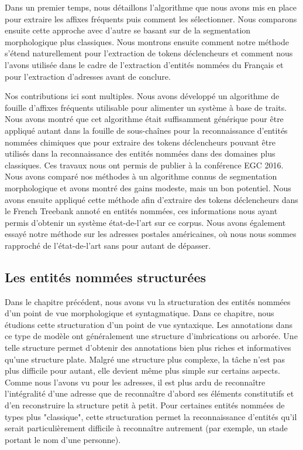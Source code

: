 \documentclass[PhD-Yoann-Dupont.tex]{subfiles}
\begin{document}
Dans un premier temps, nous détaillons l'algorithme que nous avons mis en place pour extraire les affixes fréquents puis comment les sélectionner. Nous comparons ensuite cette approche avec d'autre se basant sur de la segmentation morphologique plus classiques. Nous montrons ensuite comment notre méthode s'étend naturellement pour l'extraction de tokens déclencheurs et comment nous l'avons utilisée dans le cadre de l'extraction d'entités nommées du Français et pour l'extraction d'adresses avant de conclure.

Nos contributions ici sont multiples. Nous avons développé un algorithme de fouille d'affixes fréquents utilisable pour alimenter un système à base de traits. Nous avons montré que cet algorithme était suffisamment générique pour être appliqué autant dans la fouille de sous-chaînes pour la reconnaissance d'entités nommées chimiques que pour extraire des tokens déclencheurs pouvant être utilisés dans la reconnaissance des entités nommées dans des domaines plus classiques. Ces travaux nous ont permis de publier à la conférence EGC 2016. Nous avons comparé nos méthodes à un algorithme connus de segmentation morphologique et avons montré des gains modeste, mais un bon potentiel. Nous avons ensuite appliqué cette méthode afin d'extraire des tokens déclencheurs dans le French Treebank annoté en entités nommées, ces informations nous ayant permis d'obtenir un système état-de-l'art sur ce corpus. Nous avons également essayé notre méthode sur les adresses postales américaines, où nous nous sommes rapproché de l'état-de-l'art sans pour autant de dépasser.

\subsection*{Les entités nommées structurées}

Dans le chapitre précédent, nous avons vu la structuration des entités nommées d'un point de vue morphologique et syntagmatique. Dans ce chapitre, nous étudions cette structuration d'un point de vue syntaxique. Les annotations dans ce type de modèle ont généralement une structure d'imbrications ou arborée. Une telle structure permet d'obtenir des annotations bien plus riches et informatives qu'une structure plate. Malgré une structure plus complexe, la tâche n'est pas plus difficile pour autant, elle devient même plus simple sur certains aspects. Comme nous l'avons vu pour les adresses, il est plus ardu de reconnaître l'intégralité d'une adresse que de reconnaître d'abord ses éléments constitutifs et d'en reconstruire la structure petit à petit. Pour certaines entités nommées de types plus "classique", cette structuration permet la reconnaissance d'entités qu'il serait particulièrement difficile à reconnaître autrement (par exemple, un stade portant le nom d'une personne).
\end{document}

